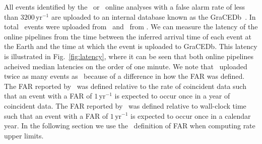 All events identified by the \gstlal\ or \mbta\ online analyses with a false alarm rate of less than
$3200 \, \mathrm{yr}^{-1}$
are uploaded to an internal database known
as the \acf{GraCEDb}~\citep{gracedb}.
In total \OoneOnlineTotalMBTAGraceDBEvents\ events were uploaded from \mbta\
and \OoneOnlineTotalGSTLALGraceDBEvents\ from \gstlal.
We can measure the latency of the online pipelines from the time between the
inferred arrival time of each event at the Earth and the time at which the
event is uploaded to \ac{GraCEDb}. This latency is illustrated in Fig.~\ref{fig:latency},
where it can be seen that both online pipelines acheived median latencies on
the order of one minute. We note that \gstlal\ uploaded twice as many events as \mbta\
because of a difference in how the FAR was defined. The FAR reported by \mbta\ was defined
relative to the rate of coincident data such that an event with a FAR of $1 \, \mathrm{yr}^{-1}$
is expected to occur once in a year of coincident data. The FAR reported by \gstlal\ was defined 
relative to wall-clock time such that an event with a FAR of $1 \, \mathrm{yr}^{-1}$
is expected to occur once in a calendar year. In the following section we use the \mbta\
definition of FAR when computing rate upper limits.